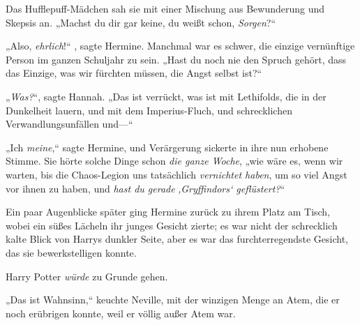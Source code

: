 Das Hufflepuff-Mädchen sah sie mit einer Mischung aus Bewunderung und Skepsis an. „Machst du dir gar keine, du weißt schon, \emph{Sorgen}?“

„Also, \emph{ehrlich}!“ , sagte Hermine. Manchmal war es schwer, die einzige vernünftige Person im ganzen Schuljahr zu sein. „Hast du noch nie den Spruch gehört, dass das Einzige, was wir fürchten müssen, die Angst selbst ist?“

„\emph{Was?}“, sagte Hannah. „Das ist verrückt, was ist mit Lethifolds, die in der Dunkelheit lauern, und mit dem Imperius-Fluch, und schrecklichen Verwandlungsunfällen und—“

„Ich \emph{meine},“ sagte Hermine, und Verärgerung sickerte in ihre nun erhobene Stimme. Sie hörte solche Dinge schon \emph{die ganze Woche}, „wie wäre es, wenn wir warten, bis die Chaos-Legion uns tatsächlich \emph{vernichtet haben}, um so viel Angst vor ihnen zu haben, und \emph{hast du gerade} \emph{‚Gryffindors‘ geflüstert?}“

Ein paar Augenblicke später ging Hermine zurück zu ihrem Platz am Tisch, wobei ein süßes Lächeln ihr junges Gesicht zierte; es war nicht der schrecklich kalte Blick von Harrys dunkler Seite, aber es war das furchterregendste Gesicht, das sie bewerkstelligen konnte.

Harry Potter \emph{würde} zu Grunde gehen.

\later

„Das ist Wahnsinn,“ keuchte Neville, mit der winzigen Menge an Atem, die er noch erübrigen konnte, weil er völlig außer Atem war.

